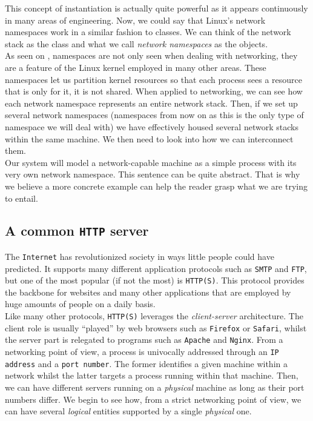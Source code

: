         This concept of instantiation is actually quite powerful as it appears continuously in many areas of engineering. Now, we could say that Linux's network namespaces work in a similar fashion to classes. We can think of the network stack as the class and what we call \textit{network namespaces} as the objects.\\

        As seen on \cite{bib:man-namespaces}, namespaces are not only seen when dealing with networking, they are a feature of the Linux kernel employed in many other areas. These namespaces let us partition kernel resources so that each process sees a resource that is only for it, it is not shared. When applied to networking, we can see how each network namespace \cite{bib:man-netns} represents an entire network stack. Then, if we set up several network namespaces (namespaces from now on as this is the only type of namespace we will deal with) we have effectively housed several network stacks within the same machine. We then need to look into how we can interconnect them.\\

        Our system will model a network-capable machine as a simple process with its very own network namespace. This sentence can be quite abstract. That is why we believe a more concrete example can help the reader grasp what we are trying to entail.\\

        \subsection{A common \texttt{HTTP} server}
            The \texttt{Internet} has revolutionized society in ways little people could have predicted. It supports many different application protocols such as \texttt{SMTP} and \texttt{FTP}, but one of the most popular (if not the most) is \texttt{HTTP(S)}. This protocol provides the backbone for websites and many other applications that are employed by huge amounts of people on a daily basis.\\

            Like many other protocols, \texttt{HTTP(S)} leverages the \textit{client-server} architecture. The client role is usually ``played'' by web browsers such as \texttt{Firefox} or \texttt{Safari}, whilst the server part is relegated to programs such as \texttt{Apache} and \texttt{Nginx}. From a networking point of view, a process is univocally addressed through an \texttt{IP address} and a \texttt{port number}. The former identifies a given machine within a network whilst the latter targets a process running within that machine. Then, we can have different servers running on a \textit{physical} machine as long as their port numbers differ. We begin to see how, from a strict networking point of view, we can have several \textit{logical} entities supported by a single \textit{physical} one.\\

